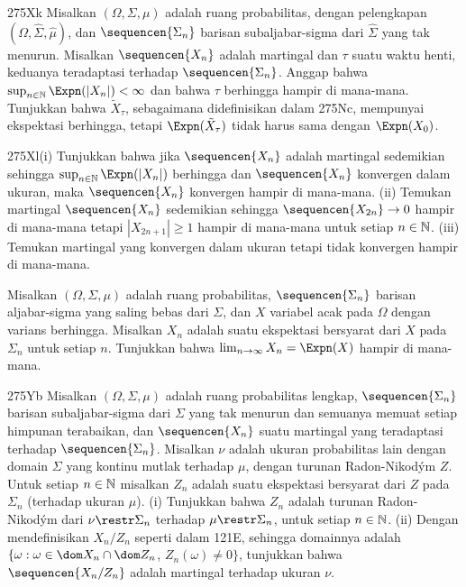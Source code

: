{\spheader 275Xk Misalkan $(\Omega,\Sigma,\mu)$ adalah ruang probabilitas,
dengan pelengkapan $(\Omega,\hat\Sigma,\hat\mu)$, dan
$\sequencen{\Sigma_n}$ barisan subaljabar-sigma dari $\hat\Sigma$ yang tak
menurun. Misalkan $\sequencen{X_n}$ adalah martingal dan $\tau$ suatu waktu
henti, keduanya teradaptasi terhadap $\sequencen{\Sigma_n}$. Anggap bahwa
$\sup_{n\in\Bbb N}\Expn(|X_n|)<\infty$ dan bahwa $\tau$ berhingga hampir di
mana-mana. Tunjukkan bahwa $\tilde X_{\tau}$, sebagaimana didefinisikan dalam
275Nc, mempunyai ekspektasi berhingga, tetapi
$\Expn(\tilde X_{\tau})$ tidak harus sama dengan $\Expn(X_0)$.

\spheader 275Xl(i) Tunjukkan bahwa jika $\sequencen{X_n}$ adalah
martingal sedemikian sehingga $\sup_{n\in\Bbb N}\Expn(|X_n|)$ berhingga dan
$\sequencen{X_n}$ konvergen dalam ukuran, maka $\sequencen{X_n}$ konvergen
hampir di mana-mana. (ii) Temukan martingal $\sequencen{X_n}$ sedemikian
sehingga $\sequencen{X_{2n}}\to 0$ hampir di mana-mana tetapi
$|X_{2n+1}|\ge 1$ hampir di mana-mana untuk setiap $n\in\Bbb N$.
(iii) Temukan martingal yang konvergen dalam ukuran tetapi tidak konvergen
hampir di mana-mana.

%
 Misalkan $(\Omega,\Sigma,\mu)$ adalah ruang probabilitas,
$\sequencen{\Sigma_n}$ barisan aljabar-sigma yang saling bebas dari $\Sigma$,
dan $X$ variabel acak pada $\Omega$ dengan varians berhingga. Misalkan $X_n$
adalah suatu ekspektasi bersyarat dari $X$ pada $\Sigma_n$ untuk setiap $n$.
Tunjukkan bahwa $\lim_{n\to\infty}X_n=\Expn(X)$ hampir di mana-mana.

\spheader 275Yb
Misalkan $(\Omega,\Sigma,\mu)$ adalah ruang probabilitas lengkap,
$\sequencen{\Sigma_n}$ barisan subaljabar-sigma dari $\Sigma$ yang tak
menurun dan semuanya memuat setiap himpunan terabaikan, dan
$\sequencen{X_n}$ suatu martingal yang teradaptasi terhadap
$\sequencen{\Sigma_n}$. Misalkan $\nu$ adalah ukuran probabilitas lain dengan
domain $\Sigma$ yang kontinu mutlak terhadap $\mu$, dengan turunan
Radon-Nikod\'ym $Z$. Untuk setiap $n\in\Bbb N$ misalkan $Z_n$ adalah suatu
ekspektasi bersyarat dari $Z$ pada $\Sigma_n$ (terhadap ukuran $\mu$).
(i) Tunjukkan bahwa $Z_n$ adalah turunan Radon-Nikod\'ym dari
$\nu\restr\Sigma_n$ terhadap $\mu\restr\Sigma_n$, untuk setiap $n\in\Bbb N$.
(ii) Dengan mendefinisikan $X_n/Z_n$ seperti dalam 121E, sehingga domainnya
adalah $\{\omega:\omega\in\dom X_n\cap\dom Z_n$, $Z_n(\omega)\ne 0\}$,
tunjukkan bahwa $\sequencen{X_n/Z_n}$ adalah martingal terhadap ukuran $\nu$.

}
